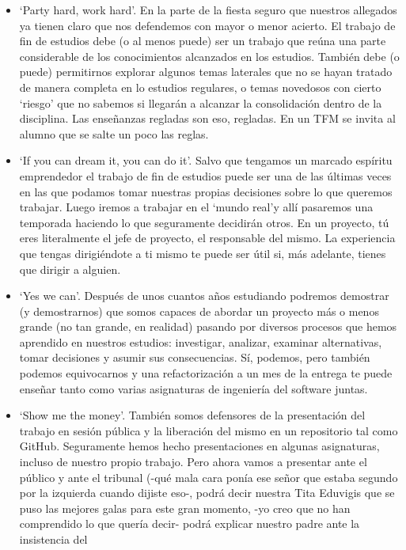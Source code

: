 \begin{itemize}
\item `Party hard, work hard'. En la parte de la fiesta seguro que
  nuestros allegados ya tienen claro que nos defendemos con mayor o
  menor acierto. El trabajo de fin de estudios debe (o al menos puede)
  ser un trabajo que reúna una parte considerable de los conocimientos alcanzados
  en los estudios. También debe (o puede) permitirnos explorar algunos
  temas laterales que no se hayan tratado de manera completa en lo
  estudios regulares, o temas novedosos con cierto `riesgo' que no
  sabemos si llegarán a alcanzar la consolidación dentro de la
  disciplina. Las enseñanzas regladas son eso, regladas. En un TFM se
  invita al alumno que se salte un poco las reglas. 
\item `If you can dream it, you can do it'. Salvo que tengamos un
  marcado espíritu emprendedor el trabajo de fin de estudios puede ser
  una de las últimas veces en las que podamos tomar nuestras propias
  decisiones sobre lo que queremos trabajar. Luego iremos a trabajar
  en el `mundo real'\textregistered y allí pasaremos una temporada
  haciendo lo que seguramente decidirán otros. En un proyecto, tú eres
  literalmente el jefe de proyecto, el responsable del mismo. La
  experiencia que tengas dirigiéndote a ti mismo te puede ser útil si,
  más adelante, tienes que dirigir a alguien. 
\item `Yes we can'. Después de unos cuantos años estudiando podremos
  demostrar (y demostrarnos) que somos capaces de abordar un proyecto
  más o menos grande (no tan grande, en realidad) pasando por diversos
  procesos que hemos aprendido en nuestros estudios: investigar,
  analizar, examinar alternativas, tomar decisiones y asumir sus
  consecuencias. Sí, podemos, pero también podemos equivocarnos y una
  refactorización a un mes de la entrega te puede enseñar tanto como
  varias asignaturas de ingeniería del software juntas. 
\item `Show me the money'. También somos defensores de la presentación del
  trabajo en sesión pública y la liberación del mismo en un
  repositorio tal como GitHub. Seguramente hemos hecho presentaciones en
  algunas asignaturas, incluso de nuestro propio trabajo. Pero ahora
  vamos a presentar ante el público y ante el tribunal (-qué mala cara
  ponía ese señor que estaba segundo por la izquierda cuando dijiste
  eso-, podrá decir nuestra Tita Eduvigis que se puso las mejores
  galas para este gran momento, -yo creo que no han comprendido lo que
  quería decir- podrá explicar nuestro padre ante la insistencia del

\end{itemize}
